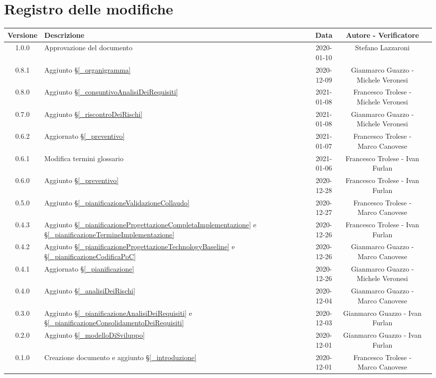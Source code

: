 \section*{Registro delle modifiche}

\begin{center}
	\begin{longtable}{|c|p{5cm}|c|c|c|}
		\hline
		\rowcolor{lighter-grayer}
		\textbf{Versione} & \textbf{Descrizione} & \textbf{Data} & \textbf{Autore - Verificatore} \\
		\hline
		\endfirsthead


		\hline
		1.0.0 & Approvazione del documento & 2020-01-10 & Stefano Lazzaroni \\
		0.8.1 & Aggiunto \S\ref{_organigramma} & 2020-12-09 & Gianmarco Guazzo - Michele Veronesi \\
		0.8.0 & Aggiunto \S\ref{_consuntivoAnalisiDeiRequisiti} & 2021-01-08 & Francesco Trolese - Michele Veronesi \\
		0.7.0 & Aggiunto \S\ref{_riscontroDeiRischi} & 2021-01-08 & Gianmarco Guazzo - Michele Veronesi \\
		0.6.2 & Aggiornato \S\ref{_preventivo} & 2021-01-07 & Francesco Trolese - Marco Canovese \\
		0.6.1 & Modifica termini glossario & 2021-01-06 & Francesco Trolese - Ivan Furlan \\
		0.6.0 & Aggiunto \S\ref{_preventivo} & 2020-12-28 & Francesco Trolese - Ivan Furlan \\
		0.5.0 & Aggiunto \S\ref{_pianificazioneValidazioneCollaudo} & 2020-12-27 & Francesco Trolese - Marco Canovese \\
		0.4.3 & Aggiunto \S\ref{_pianificazioneProgettazioneCompletaImplementazione} e \S\ref{_pianificazioneTermineImplementazione} & 2020-12-26 & Francesco Trolese - Ivan Furlan \\
		0.4.2 & Aggiunto \S\ref{_pianificazioneProgettazioneTechnologyBaseline} e \S\ref{_pianificazioneCodificaPoC} & 2020-12-26 & Gianmarco Guazzo - Marco Canovese \\
		0.4.1 & Aggiornato \S\ref{_pianificazione} & 2020-12-26 & Gianmarco Guazzo - Michele Veronesi\\
		0.4.0 & Aggiunto \S\ref{_analisiDeiRischi} & 2020-12-04 & Gianmarco Guazzo - Marco Canovese \\
		0.3.0 & Aggiunto \S\ref{_pianificazioneAnalisiDeiRequisiti} e \S\ref{_pianificazioneConsolidamentoDeiRequisiti} & 2020-12-03 & Gianmarco Guazzo - Ivan Furlan \\
		0.2.0 & Aggiunto \S\ref{_modelloDiSviluppo} & 2020-12-01 & Gianmarco Guazzo - Ivan Furlan \\
		0.1.0 & Creazione documento e aggiunto \S\ref{_introduzione} & 2020-12-01 & Francesco Trolese - Marco Canovese \\
		\hline
	\end{longtable}
\end{center}